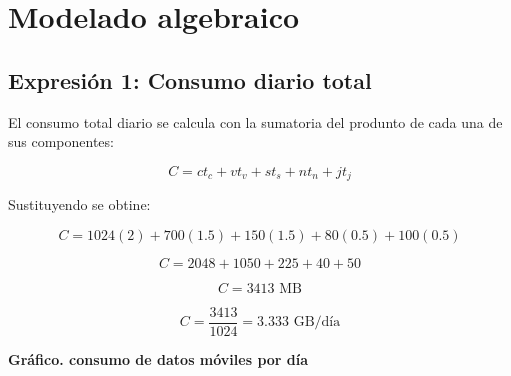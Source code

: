 \documentclass[12pt,a4paper]{article}
\begin{document}
	\section{Modelado algebraico}
	
	\subsection{Expresión 1: Consumo diario total}
	
	El consumo total diario se calcula con la sumatoria del produnto de cada una de sus componentes:
	
	\[
	C=ct_c+vt_v+st_s+nt_n+jt_j
	\]
	
	Sustituyendo se obtine:
	
	\[
	C=1024(2)+700(1.5)+150(1.5)+80(0.5)+100(0.5)
	\]
	
	\[
	C=2048+1050+225+40+50
	\]
	
	\[
	C=3413\text{ MB}
	\]
	
	\[
	C=\frac{3413}{1024}=3.333\text{ GB/día}
	\]
	\begin{center}
		{\Large\bfseries Gráfico. consumo de datos móviles por día}
	\end{center}
	
	\vspace{0.3cm}
	
\end{document}
